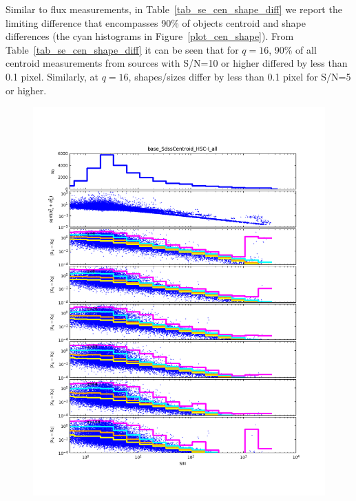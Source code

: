 Similar to flux measurements, in Table~\ref{tab_se_cen_shape_diff} we report the limiting difference 
that encompasses 90\% of objects centroid and shape differences (the cyan
histograms in Figure~\ref{plot_cen_shape}).  From Table~\ref{tab_se_cen_shape_diff} it can be seen
that for $q=16$, 90\% of all centroid measurements from sources with S/N=10 or higher differed by less
than 0.1 pixel.  Similarly, at $q=16$, shapes/sizes differ by less than 0.1 pixel for S/N=5 or higher.

\begin{figure}[t]
\centering
    \begin{minipage}{.49\textwidth}
        \centering
        \includegraphics[width=1.0\textwidth]{figure/rplot_all_base_SdssCentroid_HSC-I.png}
    \end{minipage}
    \begin{minipage}{.49\textwidth}
        \centering

\end{minipage}
\end{figure}
